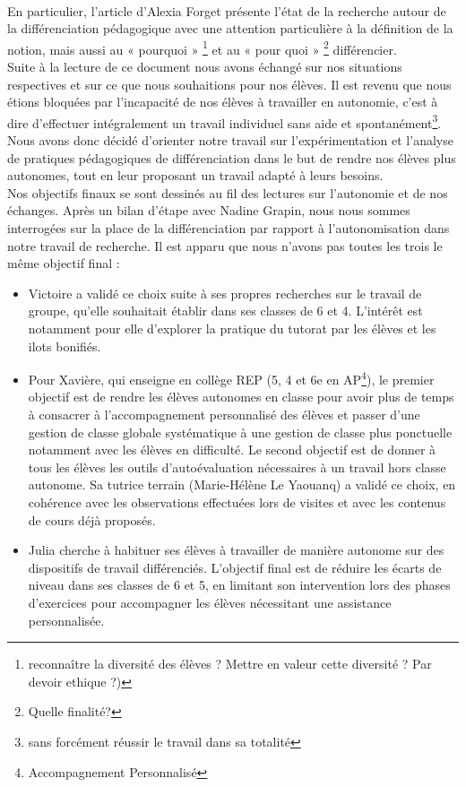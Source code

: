 \paragraph{}En particulier, l'article d'Alexia Forget\cite{cnesco_etat_lieux} présente l'état de la recherche autour de la différenciation pédagogique avec une attention particulière à la définition de la notion, mais aussi au  « pourquoi » \footnote{reconnaître la diversité des élèves ? Mettre en valeur cette diversité ? Par devoir ethique ?)} et au  « pour quoi » \footnote{Quelle finalité?} différencier.\\
Suite à la lecture de ce document nous avons échangé sur nos situations respectives et sur ce que nous souhaitions pour nos élèves. Il est revenu que nous étions bloquées par l'incapacité de nos élèves à travailler en autonomie, c'est à dire d'effectuer intégralement un travail individuel sans aide et spontanément\footnote{sans forcément réussir le travail dans sa totalité}. Nous avons donc décidé d'orienter notre travail sur l'expérimentation et l'analyse de pratiques pédagogiques de différenciation dans le but de rendre nos élèves plus autonomes, tout en leur proposant un travail adapté à leurs besoins.\\
Nos objectifs finaux se sont dessinés au fil des lectures sur l'autonomie\cite{Meirieu_autonomie}\cite{ilots_bonifies} et de nos échanges. Après un bilan d'étape avec Nadine Grapin, nous nous sommes interrogées sur la place de la différenciation par rapport à l’autonomisation dans notre travail de recherche. Il est apparu que nous n'avons pas toutes les trois le même objectif final : 
\begin{itemize}
	\item Victoire a validé ce choix suite à ses propres recherches sur le travail de groupe, qu’elle souhaitait établir dans ses classes de 6 et 4. L’intérêt est notamment pour elle d’explorer la pratique du tutorat par les élèves et les ilots bonifiés.
	\item Pour Xavière, qui enseigne en collège REP (5, 4 et 6{e} en AP\footnote{Accompagnement Personnalisé}),  le premier objectif est de rendre les élèves autonomes en classe pour avoir plus de temps à consacrer à l’accompagnement personnalisé des élèves et passer d’une gestion de classe globale systématique à une gestion de classe plus ponctuelle notamment avec les élèves en difficulté. Le second objectif est de donner à tous les élèves les outils d’autoévaluation nécessaires à un travail hors classe autonome. Sa tutrice terrain (Marie-Hélène Le Yaouanq) a validé ce choix, en cohérence avec les observations effectuées lors de visites et avec les contenus de cours déjà proposés. 
	\item  Julia cherche à habituer ses élèves à travailler de manière autonome sur des dispositifs de travail différenciés. L'objectif final est de réduire les écarts de niveau dans ses classes de 6 et 5, en limitant son intervention lors des phases d’exercices pour accompagner les élèves nécessitant une assistance personnalisée.
\end{itemize}
